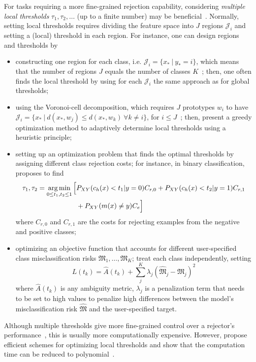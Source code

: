 For tasks requiring a more fine-grained rejection capability, considering \emph{multiple local thresholds} $\tau_1, \tau_2, \ldots$ (up to a finite number) may be beneficial~\citep{Muzzolini1998,Kummert2016,Krawczyk2018}. Normally, setting local thresholds requires dividing the feature space into $J$ regions $\mathcal{J}_i$ and setting a (local) threshold in each region. For instance, one can design regions and thresholds by
\begin{itemize}
    \item constructing one region for each  class, i.e. $\mathcal{J}_i = \{x_* \ | \ y_* = i\}$, which means that the number of regions $J$ equals the number of classes $K$~\citep{Fumera2000a}; then, one often finds the local threshold by using for each $\mathcal{J}_i$ the same approach as for global thresholds;
    \item using the Voronoi-cell decomposition, which requires $J$ prototypes $w_i$ to have $\mathcal{J}_i = \{x_* \ | \ d(x_*, w_j) \le d(x_*, w_k) \ \forall k \ne i\}$, for $i \le J$~\citep{Villmann2015,Fischer2015b,Fischer2015,Fischer2016}; then, \citet{Fischer2014b} present a greedy optimization method to adaptively determine local thresholds using a heuristic principle;
    \item setting up an optimization problem that finds the optimal thresholds by assigning different class rejection costs; for instance, in binary classification, \citet{Zheng2011} proposes to find 
    \begin{equation*}
        \begin{split}
            \tau_1, \tau_2 = \operatorname*{arg\,min}_{0\le t_1, t_2 \le 1} \Big[& P_{XY}(c_h(x)<t_1 | y = 0) C_{r,0} + P_{XY}(c_h(x)<t_2 | y = 1) C_{r,1}\\
            &+ P_{XY}(m(x) \ne y) C_e \Big]
        \end{split}
    \end{equation*}
    where $C_{r,0}$ and $C_{r,1}$ are the costs for rejecting examples from the negative and positive classes;
    \item optimizing an objective function that accounts for different user-specified class misclassification risks $\mathfrak{M}_1, \dots, \mathfrak{M}_K$; \citet{Lin2022} treat each class independently, setting
    \begin{equation*}
        L(t_k) = \hat{A}(t_k) + \sum_j^K \lambda_j (\hat{\mathfrak{M}}_j -  \mathfrak{M}_j)^2
    \end{equation*}
    where $\hat{A}(t_k)$ is any ambiguity metric, $\lambda_j$ is a penalization term that needs to be set to high values to penalize high differences between the model's misclassification risk $\hat{\mathfrak{M}}$ and the user-specified target.
\end{itemize}
Although multiple thresholds give more fine-grained control over a rejector's performance~\citep{Laroui2021,Gangrade2021a}, this is usually more computationally expensive. However, \citet{Fischer2016a} propose efficient schemes for optimizing local thresholds and show that the computation time can be reduced to polynomial~\citep{Boulegane2019}.


